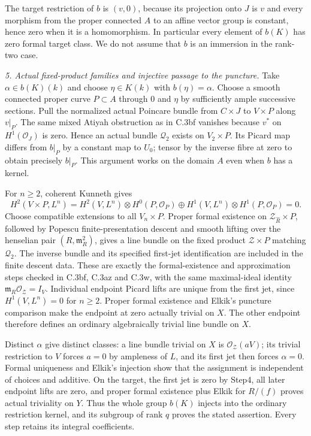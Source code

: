 The target restriction of $b$ is $(v,0)$, because its projection
onto $J$ is $v$ and every morphism from the proper connected $A$
to an affine vector group is constant, hence zero when it is a
homomorphism. In particular every element of $b(K)$ has zero
formal target class. We do not assume that $b$ is an immersion
in the rank-two case.

\emph{5. Actual fixed-product families and injective passage to the puncture.}
Take $\alpha\in b(K)(k)$ and choose $\eta\in K(k)$ with
$b(\eta)=\alpha$. Choose a smooth connected proper curve $P\subset A$
through $0$ and $\eta$ by sufficiently ample successive sections.
Pull the normalized actual Poincare bundle from $C\times J$ to
$V\times P$ along $v|_P$. The same mixed Atiyah obstruction as in
C.3bf vanishes because $v^*$ on $H^1(\mathcal O_J)$ is zero.
Hence an actual bundle $\mathcal Q_2$ exists on $V_2\times P$.
Its Picard map differs from $b|_P$ by a constant map to $U_0$;
tensor by the inverse fibre at zero to obtain precisely $b|_P$.
This argument works on the domain $A$ even when $b$ has a kernel.

For $n\ge2$, coherent Kunneth gives
\[
 H^2(V\times P,L^n)=
 H^2(V,L^n)\otimes H^0(P,\mathcal O_P)
 \oplus H^1(V,L^n)\otimes H^1(P,\mathcal O_P)=0.
\]
Choose compatible extensions to all $V_n\times P$. Proper formal
existence on $\mathcal Z_{\widehat R}\times P$, followed by Popescu
finite-presentation descent and smooth lifting over the henselian
pair $(R,\mathfrak m_R^2)$, gives a line bundle on the fixed product
$\mathcal Z\times P$ matching $\mathcal Q_2$. The inverse bundle and
its specified first-jet identification are included in the finite
descent data. These are exactly the formal-existence and approximation
steps checked in C.3bf, C.3az and C.3w, with the same maximal-ideal
identity $\mathfrak m_R\mathcal O_{\mathcal Z}=I_V$.
Individual endpoint Picard lifts are unique from the first jet,
since $H^1(V,L^n)=0$ for $n\ge2$. Proper formal existence and Elkik's
puncture comparison \citep[unnumbered corollary, p.~573]{D_Elkik1973}
make the endpoint at zero actually trivial on $X$. The other endpoint
therefore defines an ordinary algebraically trivial line bundle on $X$.

Distinct $\alpha$ give distinct classes: a line bundle trivial on
$X$ is $\mathcal O_{\mathcal Z}(aV)$; its trivial restriction to $V$
forces $a=0$ by ampleness of $L$, and its first jet then forces
$\alpha=0$. Formal uniqueness and Elkik's injection show that the
assignment is independent of choices and additive. On the target,
the first jet is zero by Step4, all later endpoint lifts are zero,
and proper formal existence plus Elkik for $R/(f)$ proves actual
triviality on $Y$. Thus the whole group $b(K)$ injects into the
ordinary restriction kernel, and its subgroup of rank $q$ proves
the stated assertion. Every step retains its integral coefficients.

